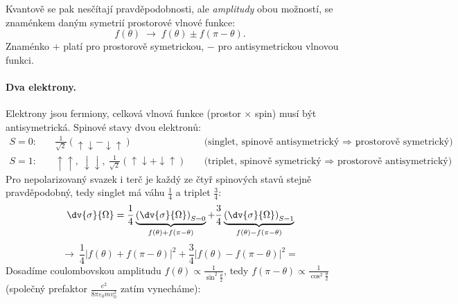 \begin{center}
\end{center}

Kvantově se pak nesčítají pravděpodobnosti, ale \emph{amplitudy} obou možností, se znaménkem daným symetrií prostorové vlnové funkce:
\begin{equation}
  f(\theta)\;\longrightarrow\; f(\theta)\pm f(\pi-\theta).
\end{equation}
Znaménko $+$ platí pro prostorově symetrickou, $-$ pro antisymetrickou vlnovou funkci.

\paragraph{Dva elektrony.} Elektrony jsou fermiony, celková vlnová funkce (prostor $\times$ spin) musí být antisymetrická. Spinové stavy dvou elektronů:
\begin{align*}
  S=0:&\quad \tfrac{1}{\sqrt2}(\uparrow\downarrow-\downarrow\uparrow) &&\text{(singlet, spinově antisymetrický $\Rightarrow$ prostorově symetrický)},\\
  S=1:&\quad \uparrow\uparrow,\ \downarrow\downarrow,\ \tfrac{1}{\sqrt2}(\uparrow\downarrow+\downarrow\uparrow) &&\text{(triplet, spinově symetrický $\Rightarrow$ prostorově antisymetrický)}.
\end{align*}
Pro nepolarizovaný svazek i terč je každý ze čtyř spinových stavů stejně pravděpodobný, tedy singlet má váhu $\frac14$ a triplet $\frac34$:
\begin{equation}
  \dv{\sigma}{\Omega} = \frac14\underbrace{\left(\dv{\sigma}{\Omega}\right)_{S=0}}_{f(\theta)+f(\pi-\theta)} + \frac34\underbrace{\left(\dv{\sigma}{\Omega}\right)_{S=1}}_{f(\theta)-f(\pi-\theta)}
\end{equation}
\begin{equation}
  \longrightarrow\ \frac14\left|f(\theta)+f(\pi-\theta)\right|^2 + \frac34\left|f(\theta)-f(\pi-\theta)\right|^2 =
\end{equation}
Dosadíme coulombovskou amplitudu $f(\theta)\propto\frac{1}{\sin^2\frac\theta2}$, tedy $f(\pi-\theta)\propto\frac{1}{\cos^2\frac\theta2}$ (společný prefaktor $\frac{e^2}{8\pi\varepsilon_0 m v_0^2}$ zatím vynecháme):

